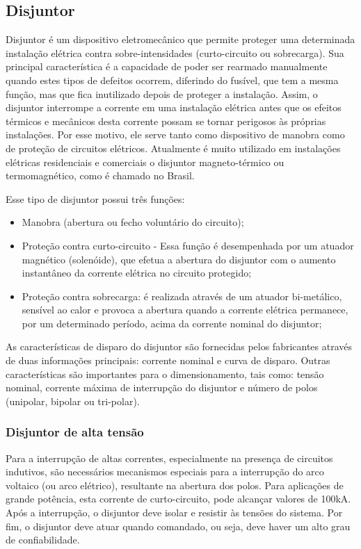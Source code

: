 \documentclass[a5paper,english,spanish,brazil]{ufsc-thesis}
\begin{document}
\subsection{Disjuntor}
Disjuntor é um dispositivo eletromecânico que permite proteger uma determinada instalação elétrica contra sobre-intensidades (curto-circuito ou sobrecarga). Sua principal característica é a capacidade de poder ser rearmado manualmente quando estes tipos de defeitos ocorrem, diferindo do fusível, que tem a mesma função, mas que fica inutilizado depois de proteger a instalação. Assim, o disjuntor interrompe a corrente em uma instalação elétrica antes que os efeitos térmicos e mecânicos desta corrente possam se tornar perigosos às próprias instalações. Por esse motivo, ele serve tanto como dispositivo de manobra como de proteção de circuitos elétricos. Atualmente é muito utilizado em instalações elétricas residenciais e comerciais o disjuntor magneto-térmico ou termomagnético, como é chamado no Brasil.\par
Esse tipo de disjuntor possui três funções:
\begin{itemize}
\item Manobra (abertura ou fecho voluntário do circuito);
\item Proteção contra curto-circuito - Essa função é desempenhada por um atuador magnético (solenóide), que efetua a abertura do disjuntor com o aumento instantâneo da corrente elétrica no circuito protegido;
\item Proteção contra sobrecarga: é realizada através de um atuador bi-metálico, sensível ao calor e provoca a abertura quando a corrente elétrica permanece, por um determinado período, acima da corrente nominal do disjuntor; 
\end{itemize}\par
As características de disparo do disjuntor são fornecidas pelos fabricantes através de duas informações principais: corrente nominal e curva de disparo. Outras características são importantes para o dimensionamento, tais como: tensão nominal, corrente máxima de interrupção do disjuntor e número de polos (unipolar, bipolar ou tri-polar).\par

\subsubsection{Disjuntor de alta tensão}
Para a interrupção de altas correntes, especialmente na presença de circuitos indutivos, são necessários mecanismos especiais para a interrupção do arco voltaico (ou arco elétrico), resultante na abertura dos polos. Para aplicações de grande potência, esta corrente de curto-circuito, pode alcançar valores de 100kA. Após a interrupção, o disjuntor deve isolar e resistir às tensões do sistema. Por fim, o disjuntor deve atuar quando comandado, ou seja, deve haver um alto grau de confiabilidade.\par
\end{document}
